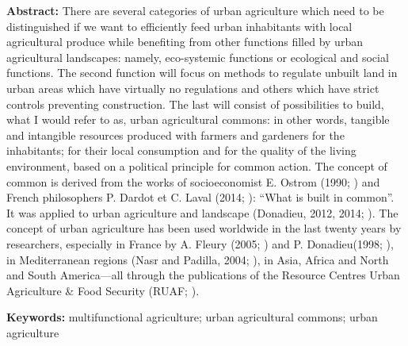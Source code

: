\documentclass[10pt,a4paper]{article}
\begin{document}
\textbf{{\color{librellogreen}Abstract:}} There are several categories of urban agriculture which need to be distinguished if we want to efficiently feed urban inhabitants with local agricultural produce while benefiting from other functions filled by urban agricultural landscapes: namely, eco-systemic functions or ecological and social functions. The second function will focus on methods to regulate unbuilt land in urban areas which have virtually no regulations and others which have strict controls preventing construction. The last will consist of possibilities to build, what I would refer to as, urban agricultural commons: in other words, tangible and intangible resources produced with farmers and gardeners for the inhabitants; for their local consumption and for the quality of the living environment, based on a political principle for common action. The concept of common is derived from the works of socioeconomist E. Ostrom (1990; \citep{r09}) and  French philosophers P. Dardot et C. Laval (2014; \citep{r01}): ``What is built in common''. It was applied to urban agriculture and landscape (Donadieu, 2012, 2014; \citep{r03, r04}). The concept of urban agriculture has been used worldwide in the last twenty years by researchers, especially in France by A. Fleury (2005; \citep{r07}) and P. Donadieu(1998; \citep{r02}), in Mediterranean regions (Nasr and Padilla, 2004; \citep{r11}), in Asia, Africa and North and South America---all through the publications of the Resource Centres  Urban Agriculture \& Food Security (RUAF; \citep{n01}).

\textbf{{\color{librellogreen}Keywords:}} multifunctional agriculture; urban agricultural commons; urban agriculture 
\par\endgroup
 
\setlength{\parindent}{0.5cm}
\setlength{\parskip}{0cm}
\setlength{\bibsep}{0cm}

\vspace*{10mm}
\end{document}
